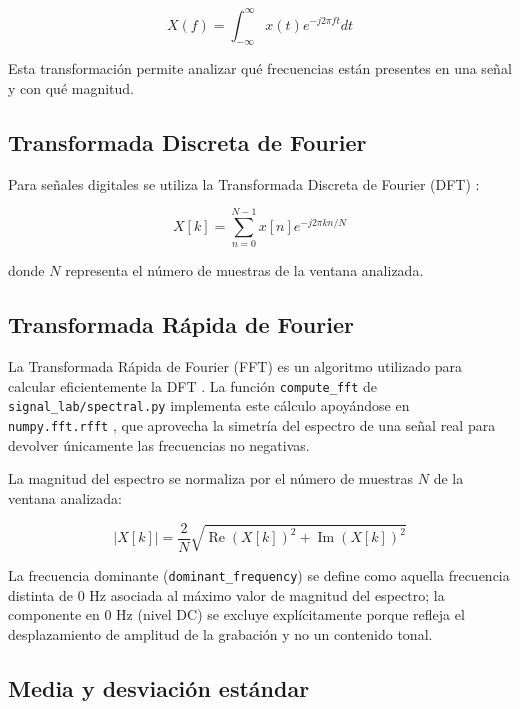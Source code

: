 \begin{equation}
X(f) =
\int_{-\infty}^{\infty}
x(t)e^{-j2\pi ft}dt
\end{equation}

Esta transformación permite analizar qué frecuencias están presentes en una señal y con qué magnitud.

\subsection{Transformada Discreta de Fourier}

Para señales digitales se utiliza la Transformada Discreta de Fourier (DFT) \cite{lyons}:

\begin{equation}
X[k] =
\sum_{n=0}^{N-1}
x[n]e^{-j2\pi kn/N}
\end{equation}

donde $N$ representa el número de muestras de la ventana analizada.

\subsection{Transformada Rápida de Fourier}

La Transformada Rápida de Fourier (FFT) es un algoritmo utilizado para calcular eficientemente la DFT \cite{lyons}. La función \texttt{compute\_fft} de \texttt{signal\_lab/spectral.py} implementa este cálculo apoyándose en \texttt{numpy.fft.rfft} \cite{numpy}, que aprovecha la simetría del espectro de una señal real para devolver únicamente las frecuencias no negativas.

La magnitud del espectro se normaliza por el número de muestras $N$ de la ventana analizada:

\begin{equation}
|X[k]| =
\frac{2}{N}
\sqrt{
\operatorname{Re}(X[k])^2+
\operatorname{Im}(X[k])^2
}
\end{equation}

La frecuencia dominante (\texttt{dominant\_frequency}) se define como aquella frecuencia distinta de $0$ Hz asociada al máximo valor de magnitud del espectro; la componente en $0$ Hz (nivel DC) se excluye explícitamente porque refleja el desplazamiento de amplitud de la grabación y no un contenido tonal.

\subsection{Media y desviación estándar}

